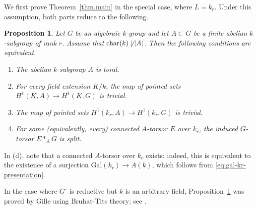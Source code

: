 \documentclass[12pt]{amsart}
\numberwithin{equation}{section}
\newtheorem{proposition}[theorem]{Proposition}
\theoremstyle{remark}
\newcommand{\Char}{\operatorname{char}}
\begin{document}
We first prove Theorem~\ref{thm.main} in the special case, where
$L = k_r$. Under this assumption, both parts reduce to the following. 

\begin{proposition}\label{prop.special_case}
    Let $G$ be an algebraic $k$-group and let $A \subset G$ be a finite abelian $k$-subgroup of rank $r$.
    Assume that $\Char(k)\not\mid |A|$.
    Then the following conditions are equivalent.
    
    \begin{enumerate}
        \item[(a)] The abelian $k$-subgroup $A$ is toral.
        \item[(b)] For every field extension $K/k$, the map of pointed sets $H^1(K, A) \to H^1(K, G)$ is trivial.
        \item[(c)] The map of pointed sets $H^1(k_r, A) \to H^1(k_r, G)$ is trivial.
        \item[(d)] For some (equivalently, every) connected $A$-torsor $E$ over $k_r$, the induced $G$-torsor $E*_AG$ is split.
    \end{enumerate}
\end{proposition}

In (d), note that a connected $A$-torsor over $k_r$ exists: indeed, this is equivalent to the existence of a surjection $\mathrm{Gal}(k_r)\to A(k)$, which follows from \eqref{eq:gal-kr-presentation}.

In the case where $G^{\circ}$ is reductive but $k$ is an arbitrary field, Proposition~\ref{prop.special_case} was proved by Gille using Bruhat-Tits theory; see \cite[Corollary 4.15]{gille:hal-04621048}.
\end{document}
